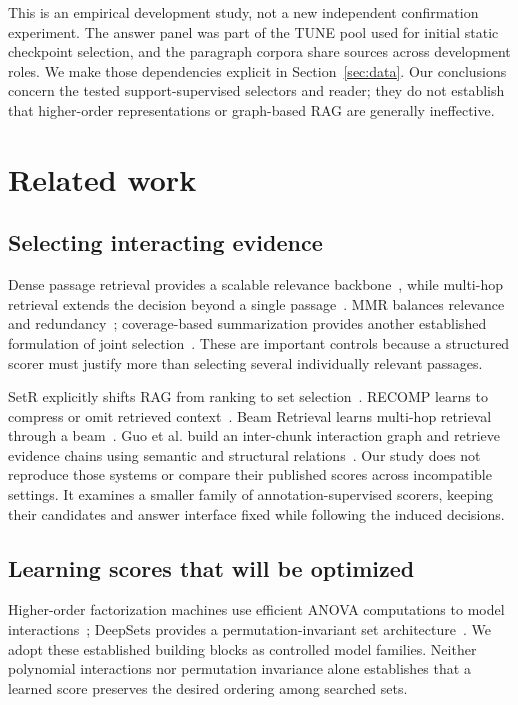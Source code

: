 \documentclass[preprint,12pt]{elsarticle}
\begin{document}
This is an empirical development study, not a new independent confirmation experiment. The answer panel was part of the TUNE pool used for initial static checkpoint selection, and the paragraph corpora share sources across development roles. We make those dependencies explicit in Section~\ref{sec:data}. Our conclusions concern the tested support-supervised selectors and reader; they do not establish that higher-order representations or graph-based RAG are generally ineffective.

\section{Related work}
\subsection{Selecting interacting evidence}
Dense passage retrieval provides a scalable relevance backbone~\cite{karpukhin2020dpr}, while multi-hop retrieval extends the decision beyond a single passage~\cite{xiong2021mdr}. MMR balances relevance and redundancy~\cite{carbonell1998mmr}; coverage-based summarization provides another established formulation of joint selection~\cite{lin2011submodular}. These are important controls because a structured scorer must justify more than selecting several individually relevant passages.

SetR explicitly shifts RAG from ranking to set selection~\cite{lee2025setr}. RECOMP learns to compress or omit retrieved context~\cite{xu2024recomp}. Beam Retrieval learns multi-hop retrieval through a beam~\cite{zhang2024beam}. Guo et al. build an inter-chunk interaction graph and retrieve evidence chains using semantic and structural relations~\cite{guo2025interchunk}. Our study does not reproduce those systems or compare their published scores across incompatible settings. It examines a smaller family of annotation-supervised scorers, keeping their candidates and answer interface fixed while following the induced decisions.

\subsection{Learning scores that will be optimized}
Higher-order factorization machines use efficient ANOVA computations to model interactions~\cite{blondel2016hofm}; DeepSets provides a permutation-invariant set architecture~\cite{zaheer2017deepsets}. We adopt these established building blocks as controlled model families. Neither polynomial interactions nor permutation invariance alone establishes that a learned score preserves the desired ordering among searched sets.
\end{document}
